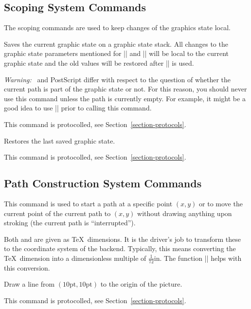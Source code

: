 \subsection{Scoping System Commands}

The scoping commands are used to keep changes of the graphics state local.

\begin{command}{\pgfsys@beginscope}
    Saves the current graphic state on a graphic state stack. All changes to
    the graphic state parameters mentioned for |\pgfsys@stroke| and
    |\pgfsys@fill| will be local to the current graphic state and the old
    values will be restored after |\pgfsys@endscope| is used.

    \emph{Warning:} \pdf\ and PostScript differ with respect to the question of
    whether the current path is part of the graphic state or not. For this
    reason, you should never use this command unless the path is currently
    empty. For example, it might be a good idea to use |\pgfsys@discardpath|
    prior to calling this command.

    This command is protocolled, see Section~\ref{section-protocols}.
\end{command}

\begin{command}{\pgfsys@endscope}
  Restores the last saved graphic state.

  This command is protocolled, see Section~\ref{section-protocols}.
\end{command}


\subsection{Path Construction System Commands}

\begin{command}{\pgfsys@moveto{}}
    This command is used to start a path at a specific point $(x,y)$ or to move
    the current point of the current path to  $(x,y)$ without drawing anything
    upon stroking (the current path is ``interrupted'').

    Both  and  are given as \TeX\ dimensions. It is the
    driver's job to transform these to the coordinate system of the backend.
    Typically, this means converting the \TeX\ dimension into a dimensionless
    multiple of $\frac{1}{72}\mathrm{in}$. The function |\pgf@sys@bp| helps
    with this conversion.

    \example Draw a line from $(10\mathrm{pt},10\mathrm{pt})$ to the origin of
    the picture.
\begin{codeexample}
\pgfsys@moveto{10pt}{10pt}
\pgfsys@lineto{0pt}{0pt}
\pgfsys@stroke
\end{codeexample}

    This command is protocolled, see Section~\ref{section-protocols}.
\end{command}

